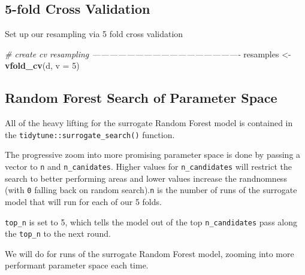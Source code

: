 \documentclass[]{book}
\newenvironment{Shaded}{\begin{snugshade}}{\end{snugshade}}
\newcommand{\KeywordTok}[1]{\textcolor[rgb]{0.13,0.29,0.53}{\textbf{#1}}}
\newcommand{\DataTypeTok}[1]{\textcolor[rgb]{0.13,0.29,0.53}{#1}}
\newcommand{\DecValTok}[1]{\textcolor[rgb]{0.00,0.00,0.81}{#1}}
\newcommand{\StringTok}[1]{\textcolor[rgb]{0.31,0.60,0.02}{#1}}
\newcommand{\CommentTok}[1]{\textcolor[rgb]{0.56,0.35,0.01}{\textit{#1}}}
\newcommand{\NormalTok}[1]{#1}
\theoremstyle{definition}
\theoremstyle{definition}
\theoremstyle{definition}
\theoremstyle{remark}
\begin{document}
\subsection{5-fold Cross Validation}\label{fold-cross-validation}

Set up our resampling via 5 fold cross validation

\begin{Shaded}
\begin{Highlighting}[]
\CommentTok{# create cv resampling ----------------------------------------------------}
\NormalTok{resamples <-}\StringTok{ }\KeywordTok{vfold_cv}\NormalTok{(d, }\DataTypeTok{v =} \DecValTok{5}\NormalTok{) }
\end{Highlighting}
\end{Shaded}

\subsection{Random Forest Search of Parameter
Space}\label{random-forest-search-of-parameter-space}

All of the heavy lifting for the surrogate Random Forest model is
contained in the \texttt{tidytune::surrogate\_search()} function.

The progressive zoom into more promising parameter space is done by
passing a vector to \texttt{n} and \texttt{n\_canidates}. Higher values
for \texttt{n\_candidates} will restrict the search to better performing
areas and lower values increase the randnomness (with \texttt{0} falling
back on random search).\texttt{n} is the number of runs of the surrogate
model that will run for each of our 5 folds.

\texttt{top\_n} is set to 5, which tells the model out of the top
\texttt{n\_candidates} pass along the \texttt{top\_n} to the next round.

We will do for runs of the surrogate Random Forest model, zooming into
more performant parameter space each time.
\end{document}
